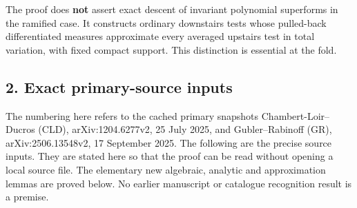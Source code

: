 \documentclass[
  11pt,
]{article}
\begin{document}
The proof does \textbf{not} assert exact descent of invariant polynomial
superforms in the ramified case. It constructs ordinary downstairs tests
whose pulled-back differentiated measures approximate every averaged
upstairs test in total variation, with fixed compact support. This
distinction is essential at the fold.

\subsection{2. Exact primary-source
inputs}\label{exact-primary-source-inputs}

The numbering here refers to the cached primary snapshots
Chambert-Loir--Ducros (CLD), arXiv:1204.6277v2, 25 July 2025, and
Gubler--Rabinoff (GR), arXiv:2506.13548v2, 17 September 2025. The
following are the precise source inputs. They are stated here so that
the proof can be read without opening a local source file. The
elementary new algebraic, analytic and approximation lemmas are proved
below. No earlier manuscript or catalogue recognition result is a
premise.
\end{document}
